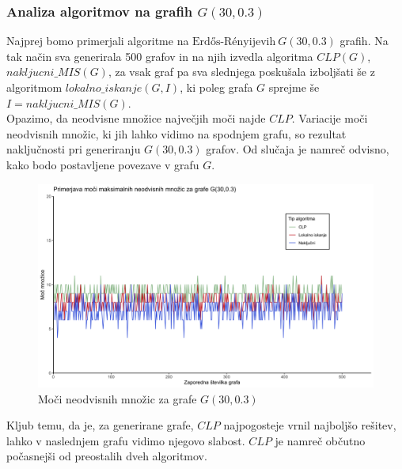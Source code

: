 \documentclass[a4paper, 12pt]{article}
\begin{document}
\subsubsection{Analiza algoritmov na grafih $G(30, 0.3)$}

Najprej bomo primerjali algoritme na $\text{Erdős-Rényijevih}\ G(30, 0.3)$ grafih. Na tak način sva generirala 500 grafov in na njih izvedla algoritma $CLP(G)$, $nakljucni\_MIS(G)$, za vsak graf pa sva slednjega poskušala izboljšati
še z algoritmom $lokalno\_iskanje(G, I)$, ki poleg grafa $G$ sprejme še $I = nakljucni\_MIS(G)$.\\

\noindent Opazimo, da neodvisne množice največjih moči najde $CLP$. Variacije moči neodvisnih množic,
ki jih lahko vidimo na spodnjem grafu, so rezultat naključnosti pri generiranju $G(30, 0.3)$ grafov.
Od slučaja je namreč odvisno, kako bodo postavljene povezave v grafu $G$.


\begin{figure}[h!]
	\begin{center}
		\includegraphics[scale=0.11]{R_koda/pon-moc.png}
		\caption{Moči neodvisnih množic za grafe $G(30,0.3)$}
	\end{center}
\end{figure}

\noindent Kljub temu, da je, za generirane grafe, $CLP$ najpogosteje vrnil najboljšo rešitev, lahko v naslednjem grafu vidimo njegovo slabost. $CLP$ je namreč občutno počasnejši od preostalih dveh algoritmov. 
\end{document}
